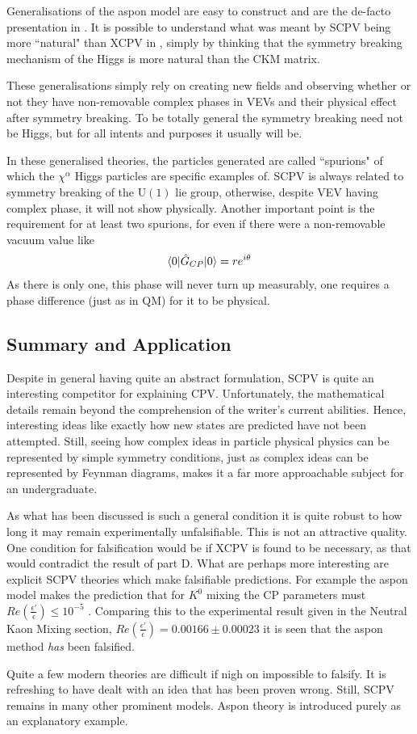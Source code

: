 Generalisations of the aspon model are easy to construct and are the de-facto presentation in \cite{SCPV5}. It is possible to understand what was meant by SCPV being more ``natural" than XCPV in \cite{SCPV1}, simply by thinking that the symmetry breaking mechanism of the Higgs is more natural than the CKM matrix.


These generalisations simply rely on creating new fields and observing whether or not they have non-removable complex phases in VEVs and their physical effect after symmetry breaking. To be totally general the symmetry breaking need not be Higgs, but for all intents and purposes it usually will be.

In these generalised theories, the particles generated are called ``spurions" of which the $\chi^\alpha$ Higgs particles are specific examples of. SCPV is always related to symmetry breaking of the $\mathrm{U}(1)$ lie group, otherwise, despite VEV having complex phase, it will not show physically. Another important point is the requirement for at least two spurions, for even if there were a non-removable vacuum value like
\begin{align*}
\braket{0|\hat{G}_{CP}|0} = r e^{i\theta}
\end{align*}
As there is only one, this phase will never turn up measurably, one requires a phase difference (just as in QM) for it to be physical.

\subsection{Summary and Application}
Despite in general having quite an abstract formulation, SCPV is quite an interesting competitor for explaining CPV. Unfortunately, the mathematical details remain beyond the comprehension of the writer's current abilities. Hence, interesting ideas like exactly how new states are predicted have not been attempted. Still, seeing how complex ideas in particle physical physics can be represented by simple symmetry conditions, just as complex ideas can be represented by Feynman diagrams, makes it a far more approachable subject for an undergraduate.

As what has been discussed is such a general condition it is quite robust to how long it may remain experimentally unfalsifiable. This is not an attractive quality. One condition for falsification would be if XCPV is found to be necessary, as that would contradict the result of part D. What are perhaps more interesting are explicit SCPV theories which make falsifiable predictions. For example the aspon model makes the prediction that for $K^0$ mixing the CP parameters must $Re(\frac{\epsilon'}{\epsilon}) \leq 10^{-5}$ \cite{SCPV7}. Comparing this to the experimental result given in the Neutral Kaon Mixing section, $Re(\frac{\epsilon'}{\epsilon})=0.00166 \pm 0.00023$ it is seen that the aspon method \textit{has} been falsified.

Quite a few modern theories are difficult if nigh on impossible to falsify. It is refreshing to have dealt with an idea that has been proven wrong. Still, SCPV remains in many other prominent models. Aspon theory is introduced purely as an explanatory example.

